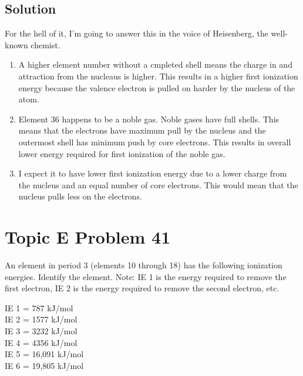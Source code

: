 \documentclass[10pt]{article}
\begin{document}
        \subsection{Solution}
            For the hell of it, I'm going to answer this in the voice of Heisenberg, the well-known chemist.
            \begin{enumerate}[label=\alph*)]
                \item   A higher element number without a cmpleted shell means the charge in and attraction from the nucleaus is higher.
                    This results in a higher first ionization energy because the valence electron is pulled on harder by the nucleus of the atom.
                \item   Element 36 happens to be a noble gas. 
                    Noble gases have full shells. 
                    This means that the electrons have maximum pull by the nucleus and the outermost shell has minimum push by core electrons.
                    This results in overall lower energy required for first ionization of the noble gas.
                \item   I expect it to have lower first ionization energy due to a lower charge from the nucleus and an equal number of core electrons.
                    This would mean that the nucleus pulls less on the electrons.
            \end{enumerate}


    \pagebreak
    \section{Topic E Problem 41}
        An element in period 3 (elements 10 through 18) has the following ionization energies.
        Identify the element. 
        Note: IE 1 is the energy required to remove the first electron, IE 2 is the energy required to remove the second electron, etc.
        \begin{multicols}{3}
            IE 1 = 787 kJ/mol\\
            IE 2 = 1577 kJ/mol\\
            IE 3 = 3232 kJ/mol\\
            IE 4 = 4356 kJ/mol\\
            IE 5 = 16,091 kJ/mol\\
            IE 6 = 19,805 kJ/mol
        \end{multicols}
\end{document}
